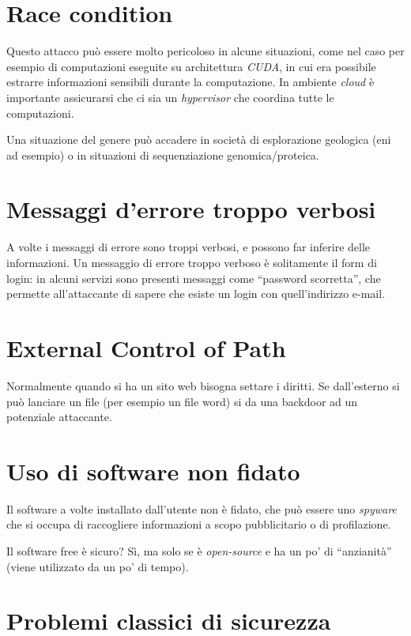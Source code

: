 
\section{Race condition}

Questo attacco può essere molto pericoloso in alcune situazioni, come nel caso 
per esempio di computazioni eseguite su architettura \textit{CUDA}, in cui era 
possibile estrarre informazioni sensibili durante la computazione. In ambiente 
\textit{cloud} è importante assicurarsi che ci sia un \textit{hypervisor} che 
coordina tutte le computazioni.

Una situazione del genere può accadere in società di esplorazione geologica (eni 
ad esempio) o in situazioni di sequenziazione genomica/proteica.

\section{Messaggi d'errore troppo verbosi}

A volte i messaggi di errore sono troppi verbosi, e possono far inferire delle 
informazioni. Un messaggio di errore troppo verboso è solitamente il form di 
login: in alcuni servizi sono presenti messaggi come ``password scorretta'', che 
permette all'attaccante di sapere che esiste un login con quell'indirizzo 
e-mail.

\section{External Control of Path}
Normalmente quando si ha un sito web bisogna settare i diritti. Se dall'esterno 
si può lanciare un file (per esempio un file word) si da una backdoor ad un 
potenziale attaccante.



\section{Uso di software non fidato}

Il software a volte installato dall'utente non è fidato, che può essere uno 
\textit{spyware} che si occupa di raccogliere informazioni a scopo pubblicitario 
o di profilazione.

Il software free è sicuro? Sì, ma solo se è \textit{open-source} e ha un po' di 
``anzianità'' (viene utilizzato da un po' di tempo).

\section{Problemi classici di sicurezza}

